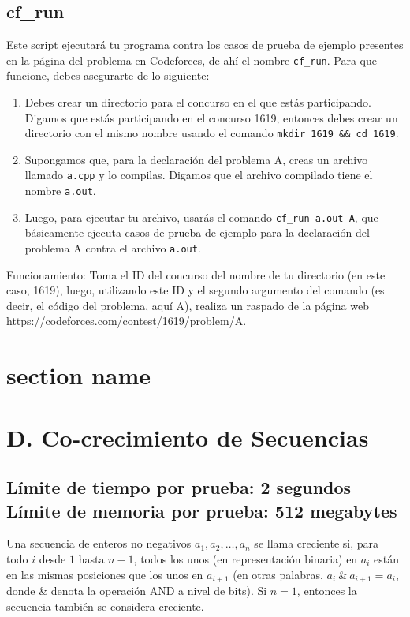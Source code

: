 \documentclass{article}
\begin{document}
\subsection*{cf\_run}

Este script ejecutará tu programa contra los casos de prueba de ejemplo presentes en la página del problema en Codeforces, de ahí el nombre \texttt{cf\_run}. Para que funcione, debes asegurarte de lo siguiente:

\begin{enumerate}
    \item Debes crear un directorio para el concurso en el que estás participando. Digamos que estás participando en el concurso 1619, entonces debes crear un directorio con el mismo nombre usando el comando \texttt{mkdir 1619 \&\& cd 1619}.
    \item Supongamos que, para la declaración del problema A, creas un archivo llamado \texttt{a.cpp} y lo compilas. Digamos que el archivo compilado tiene el nombre \texttt{a.out}.
    \item Luego, para ejecutar tu archivo, usarás el comando \texttt{cf\_run a.out A}, que básicamente ejecuta casos de prueba de ejemplo para la declaración del problema A contra el archivo \texttt{a.out}.
\end{enumerate}

Funcionamiento: Toma el ID del concurso del nombre de tu directorio (en este caso, 1619), luego, utilizando este ID y el segundo argumento del comando (es decir, el código del problema, aquí A), realiza un raspado de la página web https://codeforces.com/contest/1619/problem/A.

\section{section name}%
\label{sec:section name}
\section*{D. Co-crecimiento de Secuencias}
\subsection*{Límite de tiempo por prueba: 2 segundos \\ Límite de memoria por prueba: 512 megabytes}
Una secuencia de enteros no negativos \(a_1, a_2, \dots, a_n\) se llama creciente si, para todo \(i\) desde \(1\) hasta \(n - 1\), todos los unos (en representación binaria) en \(a_i\) están en las mismas posiciones que los unos en \(a_{i + 1}\) (en otras palabras, \(a_i \: \& \: a_{i + 1} = a_i\), donde \(\&\) denota la operación AND a nivel de bits). Si \(n = 1\), entonces la secuencia también se considera creciente.
\end{document}
